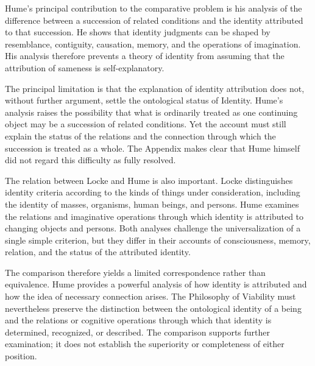 Hume's principal contribution to the comparative
problem is his analysis of the difference between
a succession of related conditions and the identity
attributed to that succession. He shows that
identity judgments can be shaped by resemblance,
contiguity, causation, memory, and the operations
of imagination. His analysis therefore prevents
a theory of identity from assuming that the
attribution of sameness is self-explanatory.

\label{para:VS.B01.P01.C08.S09.SS13.P002}

The principal limitation is that the explanation
of identity attribution does not, without further
argument, settle the ontological status of Identity.
Hume's analysis raises the possibility that what
is ordinarily treated as one continuing object
may be a succession of related conditions. Yet
the account must still explain the status of
the relations and the connection through which
the succession is treated as a whole. The
Appendix makes clear that Hume himself did
not regard this difficulty as fully resolved.

\label{para:VS.B01.P01.C08.S09.SS13.P003}

The relation between Locke and Hume is also
important. Locke distinguishes identity criteria
according to the kinds of things under consideration,
including the identity of masses, organisms,
human beings, and persons. Hume examines the
relations and imaginative operations through
which identity is attributed to changing objects
and persons. Both analyses challenge the
universalization of a single simple criterion,
but they differ in their accounts of consciousness,
memory, relation, and the status of the attributed
identity.
\cite[II.xxvii]{LockeEssay}
\cite[1.4.6]{HumeTreatise}

\label{para:VS.B01.P01.C08.S09.SS13.P004}

The comparison therefore yields a limited
correspondence rather than equivalence. Hume
provides a powerful analysis of how identity
is attributed and how the idea of necessary
connection arises. The Philosophy of Viability
must nevertheless preserve the distinction
between the ontological identity of a being
and the relations or cognitive operations
through which that identity is determined,
recognized, or described. The comparison
supports further examination; it does not
establish the superiority or completeness
of either position.


